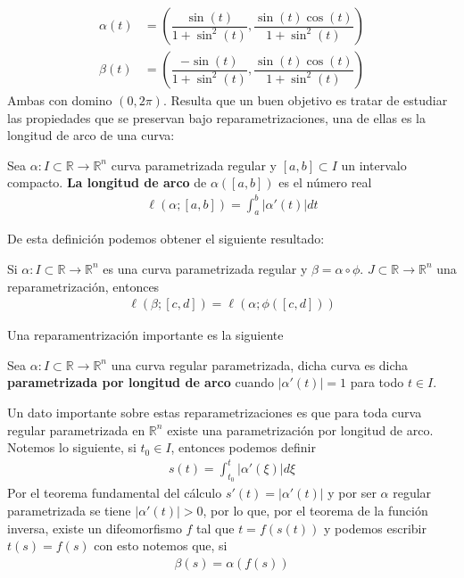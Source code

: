 \documentclass[oneside,11pt]{memoir}
\begin{document}
\begin{align*}
    \alpha(t)&=\left(\dfrac{\sin(t)}{1+\sin^2(t)},\dfrac{\sin(t)\cos(t)}{1+\sin^2(t)}\right)\\
    \beta(t)&=\left(\dfrac{-\sin(t)}{1+\sin^2(t)},\dfrac{\sin(t)\cos(t)}{1+\sin^2(t)}\right)
\end{align*}
Ambas con domino $(0,2\pi)$. Resulta que un buen objetivo es tratar de estudiar las propiedades que se preservan bajo reparametrizaciones, una de ellas es la longitud de arco de una curva:
\begin{definition}
    Sea $\alpha:I\subset \mathbb{R}\to \mathbb{R}^n$ curva parametrizada regular y $[a,b]\subset I$ un intervalo compacto. \textbf{La longitud de arco} de $\alpha([a,b])$ es el número real
    \begin{align*}
        \ell(\alpha;[a,b])=\int_a^b|\alpha'(t)|dt
    \end{align*}
\end{definition}
De esta definición podemos obtener el siguiente resultado:
\begin{proposition}
    Si $\alpha:I\subset\mathbb{R}\to \mathbb{R}^n$ es una curva parametrizada regular y $\beta=\alpha\circ\phi$. $J\subset \mathbb{R}\to\mathbb{R}^n$ una reparametrización, entonces
    \begin{align*}
        \ell(\beta;[c,d])=\ell(\alpha;\phi([c,d]))
    \end{align*}
\end{proposition}
Una reparamentrización importante es la siguiente
\begin{definition}
    Sea $\alpha:I\subset\mathbb{R}\to\mathbb{R}^n$ una curva regular parametrizada, dicha curva es dicha \textbf{parametrizada por longitud de arco} cuando $|\alpha'(t)|=1$ para todo $t\in I$.
\end{definition}
Un dato importante sobre estas reparametrizaciones es que para toda curva regular parametrizada en $\mathbb{R}^n$ existe una parametrización por longitud de arco. Notemos lo siguiente, si $t_0\in I$, entonces podemos definir
\begin{align*}
    s(t)=\int_{t_0}^t|\alpha'(\xi)|d\xi
\end{align*}
Por el teorema fundamental del cálculo $s'(t)=|\alpha'(t)|$ y por ser $\alpha$ regular parametrizada se tiene $|\alpha'(t)|>0$, por lo que, por el teorema de la función inversa, existe un difeomorfismo $f$ tal que $t=f(s(t))$ y podemos escribir $t(s)=f(s)$ con esto notemos que, si
\begin{align*}
   \beta(s)=\alpha(f(s)) 
\end{align*}
\end{document}
